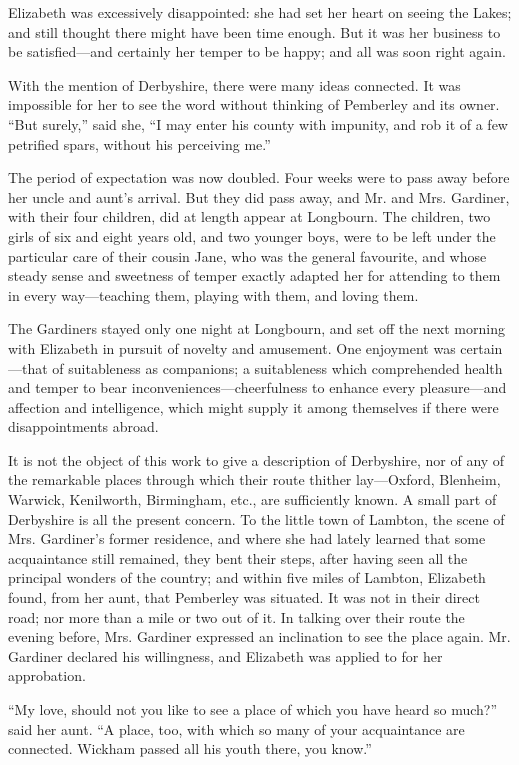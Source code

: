 \documentclass[12pt,openright]{book}
\begin{document}
Elizabeth was excessively disappointed: she had set her heart on seeing the Lakes; and still thought there might have been time enough. But it was her business to be satisfied—and certainly her temper to be happy; and all was soon right again.

With the mention of Derbyshire, there were many ideas connected. It was impossible for her to see the word without thinking of Pemberley and its owner. “But surely,” said she, “I may enter his county with impunity, and rob it of a few petrified spars, without his perceiving me.”

The period of expectation was now doubled. Four weeks were to pass away before her uncle and aunt’s arrival. But they did pass away, and Mr. and Mrs. Gardiner, with their four children, did at length appear at Longbourn. The children, two girls of six and eight years old, and two younger boys, were to be left under the particular care of their cousin Jane, who was the general favourite, and whose steady sense and sweetness of temper exactly adapted her for attending to them in every way—teaching them, playing with them, and loving them.

The Gardiners stayed only one night at Longbourn, and set off the next morning with Elizabeth in pursuit of novelty and amusement. One enjoyment was certain—that of suitableness as companions; a suitableness which comprehended health and temper to bear inconveniences—cheerfulness to enhance every pleasure—and affection and intelligence, which might supply it among themselves if there were disappointments abroad.

It is not the object of this work to give a description of Derbyshire, nor of any of the remarkable places through which their route thither lay—Oxford, Blenheim, Warwick, Kenilworth, Birmingham, etc., are sufficiently known. A small part of Derbyshire is all the present concern. To the little town of Lambton, the scene of Mrs. Gardiner’s former residence, and where she had lately learned that some acquaintance still remained, they bent their steps, after having seen all the principal wonders of the country; and within five miles of Lambton, Elizabeth found, from her aunt, that Pemberley was situated. It was not in their direct road; nor more than a mile or two out of it. In talking over their route the evening before, Mrs. Gardiner expressed an inclination to see the place again. Mr. Gardiner declared his willingness, and Elizabeth was applied to for her approbation.

“My love, should not you like to see a place of which you have heard so much?” said her aunt. “A place, too, with which so many of your acquaintance are connected. Wickham passed all his youth there, you know.”
\end{document}
